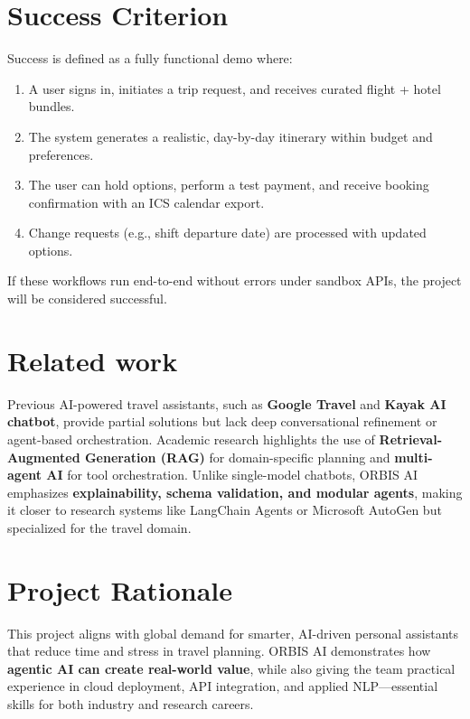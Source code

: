 \documentclass[12pt,a4paper]{article}
\begin{document}
\section{Success Criterion}

Success is defined as a fully functional demo where:

\begin{enumerate}
\item A user signs in, initiates a trip request, and receives curated flight + hotel bundles.
\item The system generates a realistic, day-by-day itinerary within budget and preferences.
\item The user can hold options, perform a test payment, and receive booking confirmation with an ICS calendar export.
\item Change requests (e.g., shift departure date) are processed with updated options.
\end{enumerate}

If these workflows run end-to-end without errors under sandbox APIs, the project will be considered successful.

\section{Related work }

Previous AI-powered travel assistants, such as \textbf{Google Travel} and \textbf{Kayak AI chatbot}, provide partial solutions but lack deep conversational refinement or agent-based orchestration. Academic research highlights the use of \textbf{Retrieval-Augmented Generation (RAG)} for domain-specific planning and \textbf{multi-agent AI} for tool orchestration. Unlike single-model chatbots, ORBIS AI emphasizes \textbf{explainability, schema validation, and modular agents}, making it closer to research systems like LangChain Agents or Microsoft AutoGen but specialized for the travel domain.

\section{Project Rationale}

This project aligns with global demand for smarter, AI-driven personal assistants that reduce time and stress in travel planning. ORBIS AI demonstrates how \textbf{agentic AI can create real-world value}, while also giving the team practical experience in cloud deployment, API integration, and applied NLP—essential skills for both industry and research careers.
\end{document}
